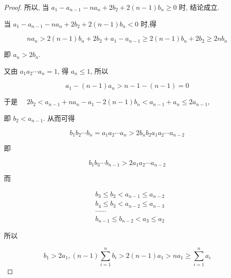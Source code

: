 \begin{proof}
	所以, 当 $a_{1}-a_{n-1}-n a_{n}+2 b_{2}+2(n-1) b_{n} \geqslant 0$ 时, 结论成立.
	
	当 $a_{1}-a_{n-1}-n a_{n}+2 b_{2}+2(n-1) b_{n}<0$ 时,得
	
	$$
	n a_{n}>2(n-1) b_{n}+2 b_{2}+a_{1}-a_{n-1} \geqslant 2(n-1) b_{n}+2 b_{2} \geqslant 2 n b_{n}
	$$
	
	即 $a_{n}>2 b_{n}$.
	
	又由 $a_{1} a_{2} \cdots a_{n}=1$, 得 $a_{n} \leqslant 1$, 所以
	
	$$
	a_{1}-(n-1) a_{n}>n-1-(n-1)=0
	$$
	
	于是 $\quad 2 b_{2}<a_{n-1}+n a_{n}-a_{1}-2(n-1) b_{n}<a_{n-1}+a_{n} \leqslant 2 a_{n-1}$,
	
	即 $b_{2}<a_{n-1}$. 从而可得
	
	$$
	b_{1} b_{2} \cdots b_{n}=a_{1} a_{2} \cdots a_{n}>2 b_{n} b_{2} a_{1} a_{2} \cdots a_{n-2}
	$$
	
	即
	
	$$
	b_{1} b_{3} \cdots b_{n-1}>2 a_{1} a_{2} \cdots a_{n-2}
	$$
	
	而
	
	$$
	\begin{aligned}
	& b_{3} \leqslant b_{2}<a_{n-1} \leqslant a_{n-2} \\
	& b_{4} \leqslant b_{3}<a_{n-2} \leqslant a_{n-3} \\
	& \cdots \cdots \\
	& b_{n-1} \leqslant b_{n-2}<a_{3} \leqslant a_{2}
	\end{aligned}
	$$
	
	所以
	
	$$
	b_{1}>2 a_{1},(n-1) \sum_{i=1}^{n} b_{i}>2(n-1) a_{1}>n a_{1} \geqslant \sum_{i=1}^{n} a_{i}
	$$
\end{proof}
